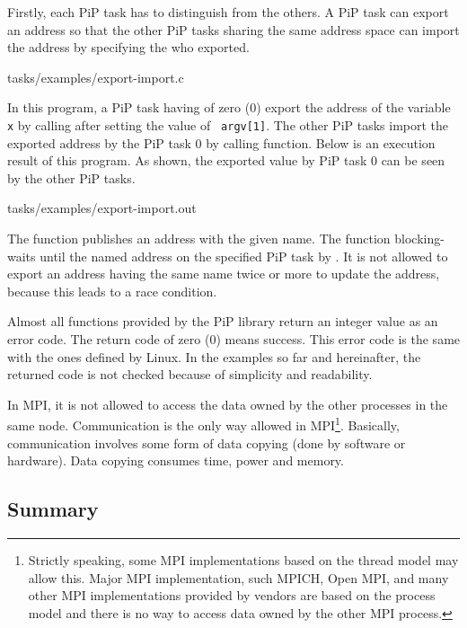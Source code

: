 Firstly, each PiP task has {\PIPID} to distinguish from the
others. A PiP task can export an address so that the other PiP tasks
sharing the same address space can import the address by
specifying the {\PIPID} who exported. 

 {tasks/examples/export-import.c}

In this program, a PiP task having {\PIPID} of zero (0) export
the address of the variable {\tt x} by calling
 after setting the value of {\tt
  argv[1]}. The 
other PiP tasks import the exported address by the PiP task 0 by
calling  function. Below is an execution
result of this program. As shown, the exported value by PiP task 0 can
be seen by the other PiP tasks. 

 {tasks/examples/export-import.out}

The  function publishes an address with
the given name. The  function
blocking-waits until the named address on the specified PiP task by
{\PIPID}. It is not allowed to export an address having the same
name twice or more to update the address, because this leads to a race
condition. 

Almost all functions provided by the PiP library return an integer
value as an error code. The return code of zero (0) means success. This
error code is the same with the ones defined by Linux. In
the examples so far and hereinafter, the returned code is not checked
because of simplicity and readability. 

In MPI, it is not allowed to access the data owned by the other
processes in the same node. Communication is the only way allowed in
MPI\footnote{Strictly speaking, some MPI implementations based on the
thread model may allow this. Major MPI implementation, such MPICH,
Open MPI, and many other MPI implementations provided by vendors are
based on the process model and there is no way to access data owned by
the other MPI process.}. Basically, communication involves some form
of data copying (done by software or hardware). Data copying consumes
time, power and memory. 

\subsection*{Summary}

